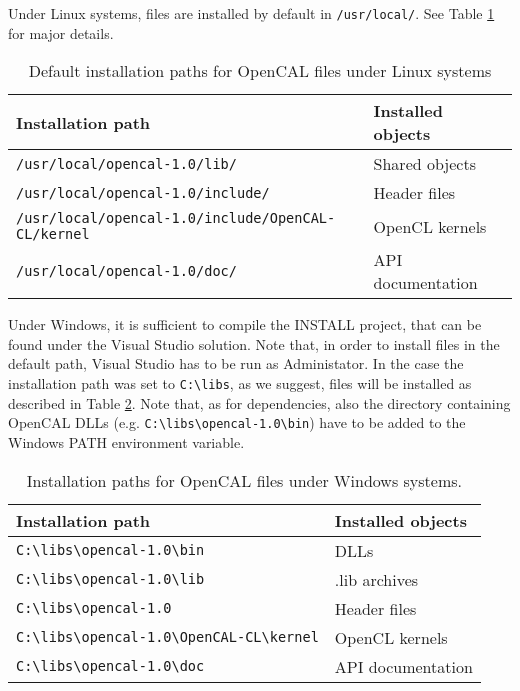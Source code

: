 \noindent Under Linux systems, files are installed by default in
\texttt{/usr/local/}. See Table \ref{ch:ddefault_paths} for major
details.

\begin{table}[h]
  \centering
  \caption{Default installation paths for OpenCAL files under Linux systems}
  \label{ch:ddefault_paths}
  \begin{tabularx}{\textwidth}{ll}
    \hline
    \textbf{Installation path} & \textbf{Installed objects}\\
    \hline
    \verb'/usr/local/opencal-1.0/lib/'                   & Shared objects \\
    \verb'/usr/local/opencal-1.0/include/'                & Header files \\
    \verb'/usr/local/opencal-1.0/include/OpenCAL-CL/kernel' & OpenCL kernels \\
    \verb'/usr/local/opencal-1.0/doc/'                   & API documentation \\
    \hline
  \end{tabularx}
\end{table}


Under Windows, it is sufficient to compile the INSTALL project, that
can be found under the Visual Studio solution. Note that, in order to
install files in the default path, Visual Studio has to be run as
Administator. In the case the installation path was set to
\verb'C:\libs', as we suggest, files will be installed as described in
Table \ref{ch:win_custom_install_paths}. Note that, as for
dependencies, also the directory containing OpenCAL DLLs
(e.g. \verb'C:\libs\opencal-1.0\bin') have to be added to the Windows
PATH environment variable.

\begin{table}[h]
  \centering
  \caption{Installation paths for OpenCAL files under Windows systems.}
  \label{ch:win_custom_install_paths}
  \begin{tabularx}{\textwidth}{ll}
    \hline
    \textbf{Installation path} & \textbf{Installed objects}\\
    \hline
    \verb'C:\libs\opencal-1.0\bin'                    & DLLs\\
    \verb'C:\libs\opencal-1.0\lib'                   & .lib archives\\
    \verb'C:\libs\opencal-1.0'                & Header files \\
    \verb'C:\libs\opencal-1.0\OpenCAL-CL\kernel' & OpenCL kernels \\
    \verb'C:\libs\opencal-1.0\doc'                   & API documentation \\
    \hline
  \end{tabularx}
\end{table}


